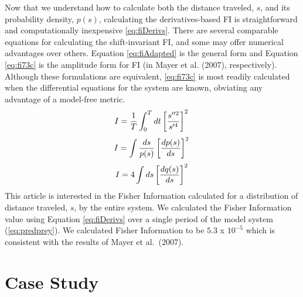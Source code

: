 \documentclass[12pt,twoside,openany]{reedthesis}
\begin{document}
Now that we understand how to calculate both the distance traveled, \(s\), and its probability density, \(p(s)\), calculating the derivatives-based FI is straightforward and computationally inexpensive \eqref{eq:fiDerivs}. There are several comparable equations for calculating the shift-invariant FI, and some may offer numerical advantages over others. Equation \eqref{eq:fiAdapted} is the general form and Equation \eqref{eq:fi73c} is the amplitude form for FI (in Mayer et al. (2007), respectively). Although these formulations are equivalent, \eqref{eq:fi73c} is most readily calculated when the differential equations for the system are known, obviating any advantage of a model-free metric.
\begin{equation}   
    I = \frac{1}{T} \int_0^T dt\left[\frac{s''^2}{s'^4}\right]^2 \\  
  \label{eq:fiDerivs}  
\end{equation}
\begin{equation} 
    I = \int \frac{ds}{p(s)}\left[\frac{dp(s)}{ds}\right]^2  \\
    \label{eq:fiAdapted}
\end{equation}
\begin{equation} 
    I = 4 \int ds\left[\frac{dq(s)}{ds}\right]^2 \\
\label{eq:fi73c}
\end{equation}
This article is interested in the Fisher Information calculated for a distribution of distance traveled, \(s\), by the entire system. We calculated the Fisher Information value using Equation \eqref{eq:fiDerivs} over a single period of the model system (\eqref{eq:predprey}). We calculated Fisher Information to be \(5.3\) x \(10^{-5}\) which is consistent with the results of Mayer et al.~(2007).

\hypertarget{case-study}{%
\section{Case Study}\label{case-study}}
\end{document}
